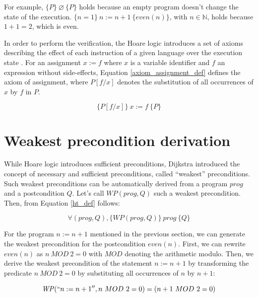 \documentclass{kththesis}
\newcommand{\htriple}[3]{\ensuremath{\{#1\}~#2~\{#3\}}}
\newcommand{\WP}{\ensuremath{\mathit{WP}}}
\begin{document}
{For example, \htriple{P}{\varnothing}{P} holds because an empty program doesn't change the state of the execution. \htriple{n=1}{n:=n+1}{even(n)}, with $n \in \mathbb{N}$, holds because $1+1=2$, which is even.

In order to perform the verification, the Hoare logic introduces a set of axioms describing the effect of each instruction of a given language over the execution state \cite{hoare_axiomatic_1969}. For an assignment $x:=f$ where $x$ is a variable identifier and $f$ an expression without side-effects, Equation \ref{axiom_assignment_def} defines the axiom of assignment, where $P[f/x]$ denotes the substitution of all occurrences of $x$ by $f$ in $P$.

\begin{equation}
  \htriple{P[f/x]}{x:=f}{P}
  \label{axiom_assignment_def}
\end{equation}


\section{Weakest precondition derivation}

While Hoare logic introduces sufficient preconditions, Dijkstra introduced the concept of necessary and sufficient preconditions, called ``weakest'' preconditions. Such weakest preconditions can be automatically derived from a program $prog$ and a postcondition $Q$. Let's call $\WP(prog, Q)$ such a weakest precondition. Then, from Equation \ref{ht_def} follows:

\begin{equation}
  \forall (prog, Q),
  \htriple{\WP(prog,Q)}{prog}{Q}
  \label{ht_wp_eq}
\end{equation}

For the program $n:=n+1$ mentioned in the previous section, we can generate the weakest precondition for the postcondition $even(n)$. First, we can rewrite $even(n)$ as $n~MOD~2 = 0$ with $MOD$ denoting the arithmetic modulo. Then, we derive the weakest precondition of the statement $n:=n+1$ by transforming the predicate $n~MOD~2 = 0$ by substituting all occurrences of $n$ by $n+1$:

\begin{equation}
  \WP(``n:=n+1'',n~MOD~2 = 0)=(n+1~MOD~2 = 0)
  \label{wp_comp_n_inc_even}
\end{equation}

}
\end{document}
